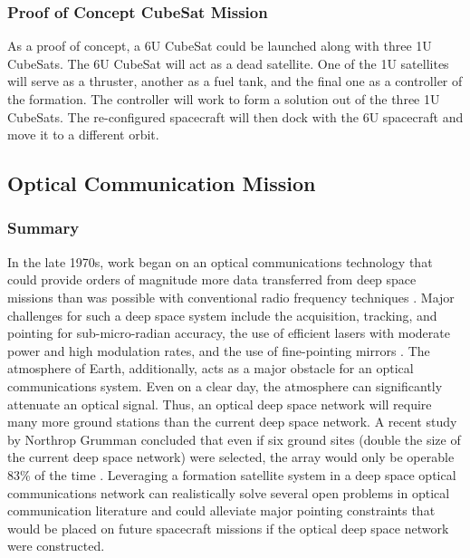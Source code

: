 \subsubsection{Proof of Concept CubeSat Mission}
As a proof of concept, a 6U CubeSat could be launched along with three 1U CubeSats. The 6U CubeSat will act as a dead satellite. One of the 1U satellites will serve as a thruster, another as a fuel tank, and the final one as a controller of the formation. The controller will work to form a solution out of the three 1U CubeSats. The re-configured spacecraft will then dock with the 6U spacecraft and move it to a different orbit.


\subsection{Optical Communication Mission}
\subsubsection{Summary}
In the late 1970s, work began on an optical communications technology that could provide orders of magnitude more data transferred from deep space missions than was possible with conventional radio frequency techniques \cite{Hemmati}. Major challenges for such a deep space system include the acquisition, tracking, and pointing for sub-micro-radian accuracy, the use of efficient lasers with moderate power and high modulation rates, and the use of fine-pointing mirrors \cite{FlightRD}. The atmosphere of Earth, additionally, acts as a major obstacle for an optical communications system. Even on a clear day, the atmosphere can significantly attenuate an optical signal. Thus, an optical deep space network will require many more ground stations than the current deep space network. A recent study by Northrop Grumman concluded that even if six ground sites (double the size of the current deep space network) were selected, the array would only be operable 83\% of the time \cite{Wojcik}. Leveraging a formation satellite system in a deep space optical communications network can realistically solve several open problems in optical communication literature and could alleviate major pointing constraints that would be placed on future spacecraft missions if the optical deep space network were constructed.

